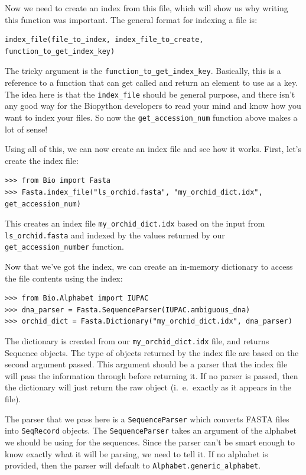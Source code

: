 \documentclass{report}
\begin{document}
Now we need to create an index from this file, which will show us why writing this function was important. The general format for indexing a file is:

\begin{verbatim}
index_file(file_to_index, index_file_to_create, function_to_get_index_key)
\end{verbatim}

The tricky argument is the \verb|function_to_get_index_key|. Basically, this is a reference to a function that can get called and return an element to use as a key. The idea here is that the \verb|index_file| should be general purpose, and there isn't any good way for the Biopython developers to read your mind and know how you want to index your files. So now the \verb|get_accession_num| function above makes a lot of sense!


Using all of this, we can now create an index file and see how it works. First, let's create the index file:

\begin{verbatim}
>>> from Bio import Fasta 
>>> Fasta.index_file("ls_orchid.fasta", "my_orchid_dict.idx", get_accession_num)
\end{verbatim}

This creates an index file \verb|my_orchid_dict.idx| based on the input from \verb|ls_orchid.fasta| and indexed by the values returned by our \verb|get_accession_number| function.


Now that we've got the index, we can create an in-memory dictionary to access the file contents using the index:

\begin{verbatim}
>>> from Bio.Alphabet import IUPAC
>>> dna_parser = Fasta.SequenceParser(IUPAC.ambiguous_dna)
>>> orchid_dict = Fasta.Dictionary("my_orchid_dict.idx", dna_parser)
\end{verbatim} 

The dictionary is created from our \verb|my_orchid_dict.idx| file, and returns Sequence objects. The type of objects returned by the index file are based on the second argument passed. This argument should be a parser that the index file will pass the information through before returning it. If no parser is passed, then the dictionary will just return the raw object (i.~e.~exactly as it appears in the file). 


The parser that we pass here is a \verb|SequenceParser| which converts FASTA files into \verb|SeqRecord| objects. The \verb|SequenceParser| takes an argument of the alphabet we should be using for the sequences. Since the parser can't be smart enough to know exactly what it will be parsing, we need to tell it. If no alphabet is provided, then the parser will default to \verb|Alphabet.generic_alphabet|.
\end{document}

